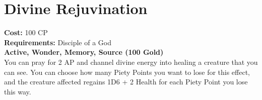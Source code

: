 \section{Divine Rejuvination}
\textbf{Cost:} 100 CP\\
\textbf{Requirements:} Disciple of a God\\
\textbf{Active, Wonder, Memory, Source (100 Gold)}\\
You can pray for 2 AP and channel divine energy into healing a creature that you can see. You can choose how many Piety Points you want to lose for this effect, and the creature affected regains 1D6 + 2 Health for each Piety Point you lose this way.\\
\\